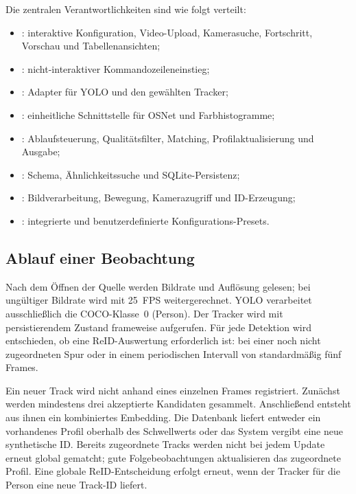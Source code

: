\documentclass[runningheads]{llncs}
\begin{document}
Die zentralen Verantwortlichkeiten sind wie folgt verteilt:

\begin{itemize}
\item {}: interaktive Konfiguration, Video-Upload, Kamerasuche, Fortschritt, Vorschau und Tabellenansichten;
\item {}: nicht-interaktiver Kommandozeileneinstieg;
\item {}: Adapter für YOLO und den gewählten Tracker;
\item {}: einheitliche Schnittstelle für OSNet und Farbhistogramme;
\item {}: Ablaufsteuerung, Qualitätsfilter, Matching, Profilaktualisierung und Ausgabe;
\item {}: Schema, Ähnlichkeitssuche und SQLite-Persistenz;
\item {}: Bildverarbeitung, Bewegung, Kamerazugriff und ID-Erzeugung;
\item {}: integrierte und benutzerdefinierte Konfigurations-Presets.
\end{itemize}

\subsection{Ablauf einer Beobachtung}

Nach dem Öffnen der Quelle werden Bildrate und Auflösung gelesen; bei ungültiger Bildrate wird mit 25~FPS weitergerechnet. YOLO verarbeitet ausschließlich die COCO-Klasse~0 (Person). Der Tracker wird mit persistierendem Zustand frameweise aufgerufen. Für jede Detektion wird entschieden, ob eine ReID-Auswertung erforderlich ist: bei einer noch nicht zugeordneten Spur oder in einem periodischen Intervall von standardmäßig fünf Frames.

Ein neuer Track wird nicht anhand eines einzelnen Frames registriert. Zunächst werden mindestens drei akzeptierte Kandidaten gesammelt. Anschließend entsteht aus ihnen ein kombiniertes Embedding. Die Datenbank liefert entweder ein vorhandenes Profil oberhalb des Schwellwerts oder das System vergibt eine neue synthetische ID. Bereits zugeordnete Tracks werden nicht bei jedem Update erneut global gematcht; gute Folgebeobachtungen aktualisieren das zugeordnete Profil. Eine globale ReID-Entscheidung erfolgt erneut, wenn der Tracker für die Person eine neue Track-ID liefert.
\end{document}

